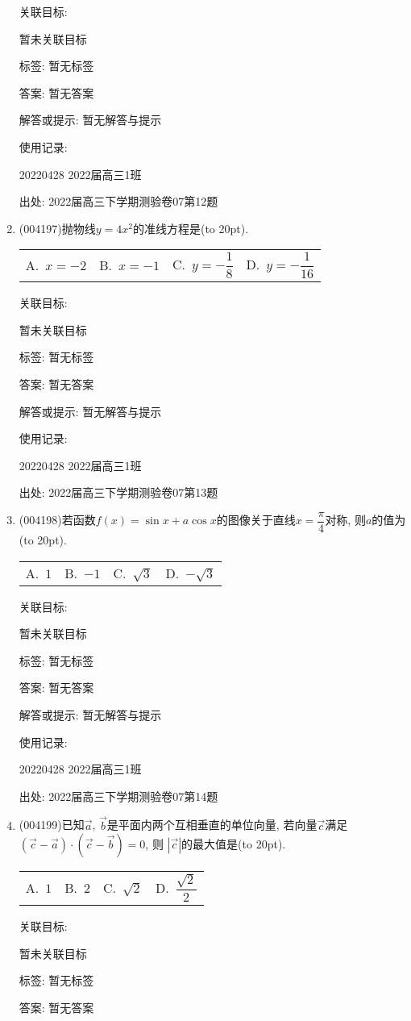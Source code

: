 \documentclass[10pt,a4paper]{article}
\newcommand{\bracket}[1]{(\hbox to #1pt{})}
\newcommand{\fourch}[4]{\par\begin{tabular}{p{.23\textwidth}p{.23\textwidth}p{.23\textwidth}p{.23\textwidth}}
A.~#1 &B.~#2& C.~#3& D.~#4
\end{tabular}}
\begin{document}
\begin{enumerate}[1.]
关联目标:

暂未关联目标



标签: 暂无标签

答案: 暂无答案

解答或提示: 暂无解答与提示

使用记录:

20220428	2022届高三1班	


出处: 2022届高三下学期测验卷07第12题
\item { (004197)}抛物线$y=4x^2$的准线方程是\bracket{20}.
\fourch{$x=-2$}{$x=-1$}{$y=-\dfrac 18$}{$y=-\dfrac 1{16}$}


关联目标:

暂未关联目标



标签: 暂无标签

答案: 暂无答案

解答或提示: 暂无解答与提示

使用记录:

20220428	2022届高三1班	


出处: 2022届高三下学期测验卷07第13题
\item { (004198)}若函数$f(x)=\sin x+a\cos x$的图像关于直线$x=\dfrac{\pi}4$对称, 则$a$的值为\bracket{20}.
\fourch{$1$}{$-1$}{$\sqrt 3$}{$-\sqrt 3$}


关联目标:

暂未关联目标



标签: 暂无标签

答案: 暂无答案

解答或提示: 暂无解答与提示

使用记录:

20220428	2022届高三1班	


出处: 2022届高三下学期测验卷07第14题
\item { (004199)}已知$\overrightarrow a$, $\overrightarrow b$是平面内两个互相垂直的单位向量, 若向量$\overrightarrow c$满足$(\overrightarrow c-\overrightarrow a)\cdot (\overrightarrow c-\overrightarrow b)=0$, 则
$|\overrightarrow c|$的最大值是\bracket{20}.
\fourch{$1$}{$2$}{$\sqrt 2$}{$\dfrac{\sqrt 2}2$}


关联目标:

暂未关联目标



标签: 暂无标签

答案: 暂无答案


\end{enumerate}
\end{document}
